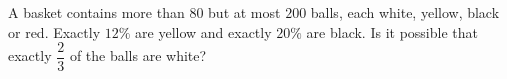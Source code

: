 A basket contains more than $80$ but at most $200$ balls, each white, yellow, black or red. Exactly $12\%$ are yellow and exactly $20\%$ are black. Is it possible that exactly $\dfrac23$ of the balls are white?
